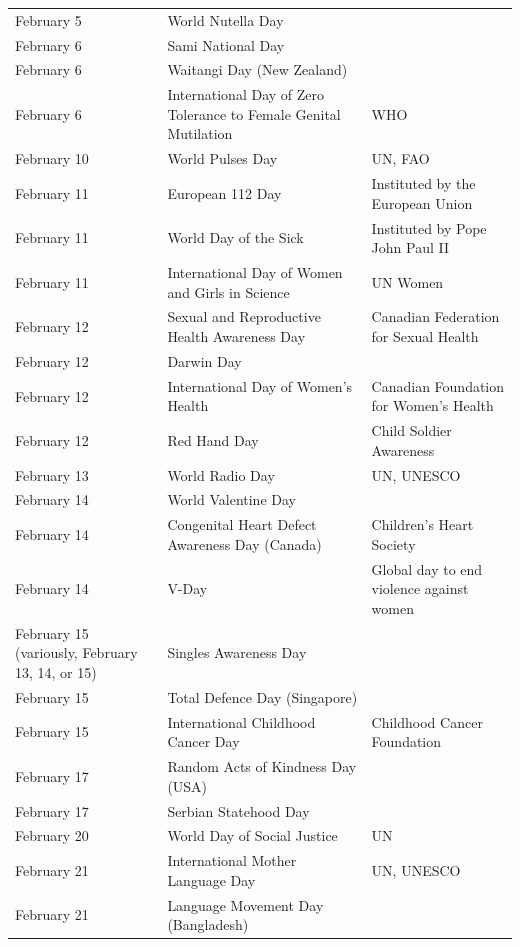 \documentclass[
  openany]{book}
\begin{document}
\begin{longtable}[t]{>{\raggedright\arraybackslash}p{8em}>{\raggedright\arraybackslash}p{18em}>{\raggedright\arraybackslash}p{10em}}
February 5 & World Nutella Day & \\
\rowcolor{gray!6}  February 6 & Sami National Day & \\
February 6 & Waitangi Day (New Zealand) & \\
\rowcolor{gray!6}  February 6 & International Day of Zero Tolerance to Female Genital Mutilation & WHO\\
\addlinespace
February 10 & World Pulses Day & UN, FAO\\
\rowcolor{gray!6}  February 11 & European 112 Day & Instituted by the European Union\\
February 11 & World Day of the Sick & Instituted by Pope John Paul II\\
\rowcolor{gray!6}  February 11 & International Day of Women and Girls in Science & UN Women\\
February 12 & Sexual and Reproductive Health Awareness Day & Canadian Federation for Sexual Health\\
\addlinespace
\rowcolor{gray!6}  February 12 & Darwin Day & \\
February 12 & International Day of Women's Health & Canadian Foundation for Women's Health\\
\rowcolor{gray!6}  February 12 & Red Hand Day & Child Soldier Awareness\\
February 13 & World Radio Day & UN, UNESCO\\
\rowcolor{gray!6}  February 14 & World Valentine Day & \\
\addlinespace
February 14 & Congenital Heart Defect Awareness Day (Canada) & Children's Heart Society\\
\rowcolor{gray!6}  February 14 & V-Day & Global day to end violence against women\\
February 15 (variously, February 13, 14, or 15) & Singles Awareness Day & \\
\rowcolor{gray!6}  February 15 & Total Defence Day (Singapore) & \\
February 15 & International Childhood Cancer Day & Childhood Cancer Foundation\\
\addlinespace
\rowcolor{gray!6}  February 17 & Random Acts of Kindness Day (USA) & \\
February 17 & Serbian Statehood Day & \\
\rowcolor{gray!6}  February 20 & World Day of Social Justice & UN\\
February 21 & International Mother Language Day & UN, UNESCO\\
\rowcolor{gray!6}  February 21 & Language Movement Day (Bangladesh) & \\

\end{longtable}
\end{document}
